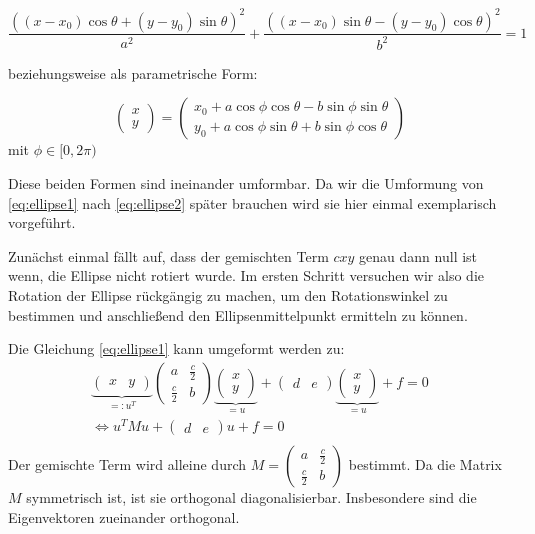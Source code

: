 \begin{equation} \label{eq:ellipse1}
\frac{((x - x_0)\cos\theta + (y - y_0)\sin\theta)^2}{a^2} + \frac{((x - x_0)\sin\theta - (y - y_0)\cos\theta)^2}{b^2} = 1
\end{equation} 


beziehungsweise als parametrische Form:

\begin{equation} \label{eq:ellipse2}
\begin{pmatrix}x \\ y\end{pmatrix} = \begin{pmatrix}x_0 + a\cos\phi\cos\theta - b\sin\phi\sin\theta \\ 
y_0 + a\cos\phi\sin\theta + b\sin\phi\cos\theta\end{pmatrix}
\end{equation}
mit $\phi \in [0, 2\pi)$

Diese beiden Formen sind ineinander umformbar. Da wir die Umformung von \ref{eq:ellipse1} nach \ref{eq:ellipse2} später brauchen wird sie hier einmal exemplarisch vorgeführt. 

Zunächst einmal fällt auf, dass der gemischten Term $cxy$ genau dann null ist wenn, die Ellipse nicht rotiert wurde. Im ersten Schritt versuchen wir also die Rotation der Ellipse rückgängig zu machen, um den Rotationswinkel zu bestimmen und anschließend den Ellipsenmittelpunkt ermitteln zu können.

Die Gleichung \ref{eq:ellipse1} kann umgeformt werden zu:
\begin{equation*}
\begin{aligned}
\underbrace{\begin{pmatrix}x & y\end{pmatrix}}_{=:u^T}\begin{pmatrix}a & \frac{c}{2} \\ \frac{c}{2} & b\end{pmatrix}\underbrace{\begin{pmatrix}x \\ y\end{pmatrix}}_{=u} +\begin{pmatrix}d & e\end{pmatrix}\underbrace{\begin{pmatrix}x \\ y\end{pmatrix}}_{=u}+ f = 0 \\
\Leftrightarrow u^TMu +\begin{pmatrix}d & e\end{pmatrix}u + f = 0 \\
\end{aligned}
\end{equation*} 
Der gemischte Term wird alleine durch $M = \begin{pmatrix}a & \frac{c}{2} \\ \frac{c}{2} & b\end{pmatrix}$ bestimmt. Da die Matrix $M$ symmetrisch ist, ist sie orthogonal diagonalisierbar. Insbesondere sind die Eigenvektoren zueinander orthogonal.

